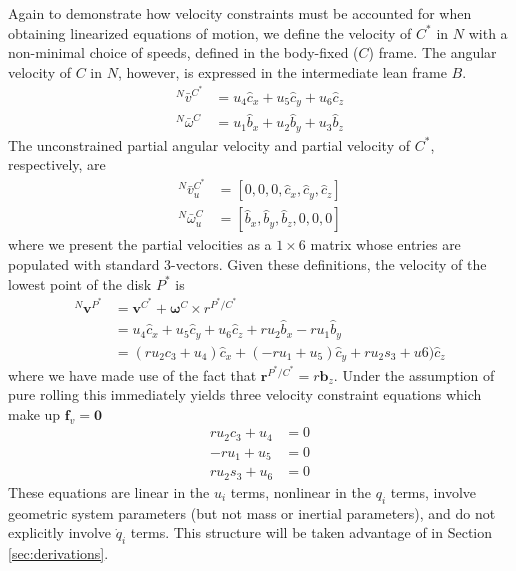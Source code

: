 \documentclass[smallcondensed,final]{svjour3}                     %
\begin{document}
Again to demonstrate how velocity constraints must be accounted for when
obtaining linearized equations of motion, we define the velocity of $C^*$ in
$N$ with a non-minimal choice of speeds, defined in the body-fixed ($C$) frame.
The angular velocity of $C$ in $N$, however, is expressed in the intermediate
lean frame $B$.
\begin{align}
  \label{v_u}
  {^N}\bar{v}^{C^*} &= u_4 \hat{c}_x + u_5 \hat{c}_y + u_6 \hat{c}_z \\
  \label{w_u}
  {^N}\bar{\omega}^C &= u_1 \hat{b}_x + u_2 \hat{b}_y + u_3 \hat{b}_z
\end{align}
The unconstrained partial angular velocity and partial velocity of $C^*$,
respectively, are
\begin{align}
  {^N}\bar{v}^{C^*}_u &= [0, 0, 0, \hat{c}_x, \hat{c}_y, \hat{c}_z] \\
  {^N}\bar{\omega}^C_u &= [\hat{b}_x, \hat{b}_y, \hat{b}_z, 0, 0, 0]
\end{align}
where we present the partial velocities as a $1\times6$ matrix whose entries
are populated with standard 3-vectors. Given these definitions, the velocity of
the lowest point of the disk $P^*$ is
\begin{align*}
    {^N}\bm{v}^{P^*} &= \bm{v}^{C^*} + \bm{\omega}^{C} \times r^{P^*/C^*} \\
                     &= u_4\hat{c}_x + u_5\hat{c}_y + u_6\hat{c}_z + r u_2
                        \hat{b}_x - r u_1 \hat{b}_y \\
                     &= (r u_2 c_3 + u_4) \hat{c}_x + (-r
                        u_1 + u_5)\hat{c}_y + r u_2 s_3 +
                        u6) \hat{c}_z
\end{align*}
where we have made use of the fact that $\bm{r}^{P^*/C^*} = r\bm{b}_z$.
Under the assumption of pure rolling this immediately yields three velocity
constraint equations which make up $\mathbf{f}_v = \mathbf{0}$
\begin{subequations}
\label{rd:f_v}
\begin{align}
    r u_2 c_3 + u_4 &= 0\\
            -r u_1 + u_5 &= 0\\
    r u_2 s_3 + u_6 &= 0
\end{align}
\end{subequations}
These equations are linear in the $u_i$ terms, nonlinear in the $q_i$ terms,
involve geometric system parameters (but not mass or inertial parameters), and
do not explicitly involve $\dot{q}_i$ terms. This structure will be taken
advantage of in Section \ref{sec:derivations}.
\end{document}

